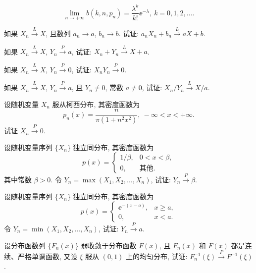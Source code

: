 \begin{xiti}
    \begin{equation*}
        \lim_{n \to +\infty} b ( k, n, p_n ) = \frac{\lambda^k}{k!} \ee^{-\lambda}, \ k = 0, 1, 2, \dotsc.
    \end{equation*}
    \item 如果 $ X_n \stackrel{L}{\to} X $, 且数列 $ a_n \to a $, $ b_n \to b $. 试证: $ a_n X_n + b_n \stackrel{L}{\to} a X + b $.
    \item 如果 $ X_n \stackrel{L}{\to} X $, $ Y_n \stackrel{P}{\to} a $, 试证: $ X_n + Y_n \stackrel{L}{\to} X + a $.
    \item 如果 $ X_n \stackrel{L}{\to} X $, $ Y_n \stackrel{P}{\to} 0 $, 试证: $ X_n Y_n \stackrel{P}{\to} 0 $.
    \item 如果 $ X_n \stackrel{L}{\to} X $, $ Y_n \stackrel{P}{\to} a $, 且 $ Y_n \neq 0 $, 常数 $ a \neq 0 $, 试证: $ X_n / Y_n \stackrel{L}{\to} X/a $.
    \item 设随机变量 $ X_n $ 服从柯西分布, 其密度函数为
    \begin{equation*}
        p_n (x) = \frac{n}{\pi (1 + n^2 x^2)}, \ -\infty < x < +\infty.
    \end{equation*}
    试证 $ X_n \stackrel{P}{\to} 0 $.
    \item 设随机变量序列 $ \{ X_n \} $ 独立同分布, 其密度函数为
    \begin{equation*}
        p (x) =
        \begin{cases}
            1 / \beta, & 0 < x < \beta,\\
            0, & \text{其他}.
        \end{cases}
    \end{equation*}
    其中常数 $ \beta > 0 $. 令 $ Y_n = \max ( X_1, X_2, \dotsc, X_n ) $, 试证: $ Y_n \stackrel{P}{\to} \beta $.
    \item 设随机变量序列 $ \{ X_n \} $ 独立同分布, 其密度函数为
    \begin{equation*}
        p (x) =
        \begin{cases}
            \ee^{- ( x - a )}, & x \geq a,\\
            0, & x < a.
        \end{cases}
    \end{equation*}
    令 $ Y_n = \min ( X_1, X_2, \dotsc, X_n ) $, 试证: $ Y_n \stackrel{P}{\to} a $.
    \item 设分布函数列 $ \{ F_n (x) \} $ 弱收敛于分布函数 $ F (x) $, 且 $ F_n (x) $ 和 $ F (x) $ 都是连续、严格单调函数, 又设 $ \xi $ 服从 $ ( 0, 1 ) $ 上的均匀分布, 试证: $ F_n^{-1} ( \xi ) \stackrel{P}{\to} F^{-1} ( \xi ) $.

\end{xiti}
